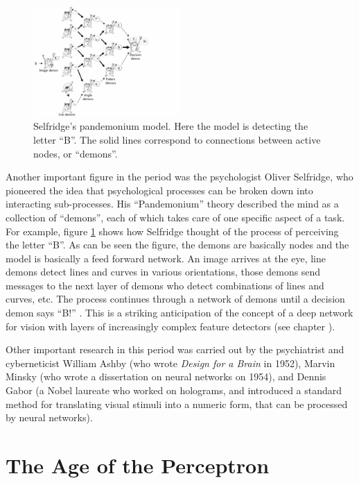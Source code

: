 \begin{figure}[h]
\centering
\includegraphics[width=0.5\textwidth]{./images/Selfridge.png}
\caption[From Groome, 2013 \cite{groome2013introduction}]{Selfridge's pandemonium model. Here the model is detecting the letter ``B''. The solid lines correspond to connections between active nodes, or ``demons''.}
\label{selfridge}
\end{figure}

Another important figure in the period was the psychologist Oliver Selfridge, who pioneered the idea that psychological processes can be broken down into interacting sub-processes. His ``Pandemonium'' theory described the mind as a collection of ``demons'', each of which takes care of one specific aspect of a task. For example, figure \ref{selfridge} shows how Selfridge thought of the process of perceiving the letter ``B''. As can be seen the figure, the demons are basically nodes and the model is basically a feed forward network. An image arrives at the eye, line demons detect lines and curves in various orientations, those demons send messages to the next layer of demons who detect combinations of lines and curves, etc. The process continues through a network of demons until a decision demon says ``B!'' \cite{selfridge1958pandemonium}.  This is a striking anticipation of the concept of a deep network for vision with layers of increasingly complex feature detectors (see chapter ).

Other important research in this period was carried out by the psychiatrist and cyberneticist William Ashby (who wrote \emph{Design for a Brain} in 1952), Marvin Minsky (who wrote a dissertation on neural networks on 1954), and Dennis Gabor (a Nobel laureate who worked on holograms, and introduced a standard method for translating visual stimuli into a numeric form, that can be processed by neural networks).

\section{The Age of the Perceptron}\label{ageOfPerceptron}

